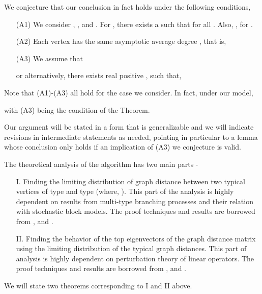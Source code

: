 \documentclass[graybox]{svmult}
\begin{document}
We conjecture that our conclusion in fact holds under the following conditions,
\begin{itemize}
\item[(A1)]\label{ass_main1}\hspace{0.1in} We consider , ,  and . For , there exists a  such that  for all . Also, , for .
\item[(A2)]\label{ass_main2}\hspace{0.1in} Each vertex has the same asymptotic average degree , that is,

\item[(A3)]\label{ass_main3}\hspace{0.1in} We assume that
 
or alternatively, there exists real positive , such that,


\end{itemize}
Note that (A1)-(A3) all hold for the case we consider. In fact, under our model,

with (A3) being the condition of the Theorem.

Our argument will be stated in a form that is generalizable and we will indicate revisions in intermediate statements as needed, pointing in particular to a lemma whose conclusion only holds if an implication of (A3) we conjecture is valid.

The theoretical analysis of the algorithm has two main parts -
\begin{itemize}
\item[I.] Finding the limiting distribution of graph distance between two typical vertices of type  and type  (where, ). This part of the analysis is highly dependent on results from multi-type branching processes and their relation with stochastic block models. The proof techniques and results are borrowed from \cite{bollobas2007phase}, \cite{bhamidi2011first} and \cite{athreya1972branching}.
\item[II.] Finding the behavior of the top  eigenvectors of the graph distance matrix  using the limiting distribution of the typical graph distances. This part of analysis is highly dependent on perturbation theory of linear operators. The proof techniques and results are borrowed from \cite{kato1995perturbation}, \cite{chatelin1983spectral} and \cite{MR3010899}.
\end{itemize}
We will state two theorems corresponding to I and II above.
\end{document}
